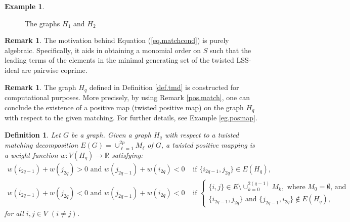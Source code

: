 \documentclass[11pt,a4paper,reqno]{amsart}
\newtheorem{definition}[thm]{Definition}
\theoremstyle{definition}
\newtheorem{remark}[thm]{Remark}
\newtheorem{eg}[thm]{Example}
\numberwithin{equation}{section}
\begin{document}
\begin{eg}
\begin{figure}[ht]
\caption{The graphs $H_1$ and $H_2$}
\label{fig.hq}
\end{figure}
\end{eg}

\begin{remark}
    The motivation behind Equation (\ref{eq.matchcond}) is purely algebraic. Specifically, it aids in obtaining a monomial order on $S$ such that the leading terms of the elements in the minimal generating set of the twisted LSS-ideal are pairwise coprime.
\end{remark}

\begin{remark}
    The graph $H_q$ defined in Definition \ref{def.tmd} is constructed for computational purposes. More precisely, by using Remark \ref{pos.match}, one can conclude the existence of a positive map (twisted positive map) on the graph $H_q$ with respect to the given matching. For further details, see Example \ref{eg.posmap}.
\end{remark}

\begin{definition} \label{def.tpmd}
    Let $G$ be a graph. Given a graph $H_q$ with respect to a twisted matching decomposition $E(G)=\cup_{\ell=1}^{2p}M_\ell$ of $G$, a twisted positive mapping is a weight function  $w: V(H_q) \rightarrow \mathbb{R}$ satisfying: 
    \begin{equation*}
    \begin{split}
       w(i_{2q-1})+w(j_{2q})>0 \text{ and } w(j_{2q-1})+w(i_{2q})<0 & \text{ if } \{i_{2q-1},j_{2q}\} \in E(H_q), \\
       w(i_{2q-1})+w(j_{2q})<0 \text{ and } w(j_{2q-1})+w(i_{2q})<0 & \text{ if } \begin{cases}
           \{i,j\} \in E \setminus \cup_{k=0}^{2(q-1)}M_k, \text{ where $M_0=\emptyset$, and } \\
           \{i_{2q-1},j_{2q}\} \text{ and } \{j_{2q-1},i_{2q}\} \notin E(H_q), 
       \end{cases}
    \end{split}
    \end{equation*}  
    for all $i,j \in V$ $(i \neq j)$.
\end{definition}
\end{document}
